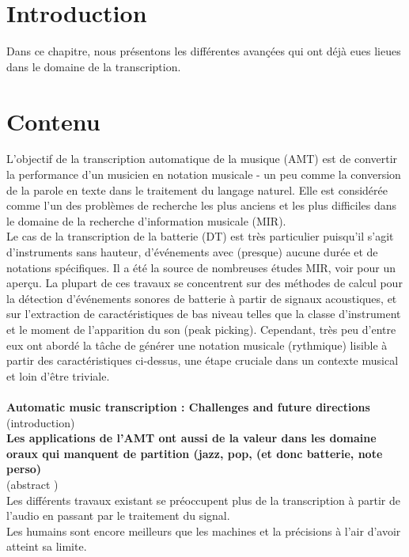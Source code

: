 \section{Introduction}

Dans ce chapitre, nous présentons les différentes avançées qui ont déjà eues lieues dans le domaine de la transcription.

\section{Contenu}
L'objectif de la transcription automatique de la musique (AMT) \cite{article1} est de convertir la performance d'un musicien en notation musicale - un peu comme la conversion de la parole en texte dans le traitement du langage naturel. Elle est considérée comme l'un des problèmes de recherche les plus anciens et les plus difficiles dans le domaine de la recherche d'information musicale (MIR).\\
Le cas de la transcription de la batterie (DT) est très particulier puisqu'il s'agit d'instruments sans hauteur, d'événements avec (presque) aucune durée et de notations spécifiques. Il a été la source de nombreuses études MIR, voir \cite{8350302} pour un aperçu. La plupart de ces travaux se concentrent sur des méthodes de calcul pour la détection d'événements sonores de batterie à partir de signaux acoustiques, et sur l'extraction de caractéristiques de bas niveau telles que la classe d'instrument et le moment de l'apparition du son (peak picking). Cependant, très peu d'entre eux ont abordé la tâche de générer une notation musicale (rythmique) lisible à partir des caractéristiques ci-dessus, une étape cruciale dans un contexte musical et loin d'être triviale.\\\\
\textbf{Automatic music transcription : Challenges and future directions} \cite{article1}\\
(introduction\cite{article1})\\
\textbf{Les applications de l’AMT ont aussi de la valeur dans les domaine oraux qui manquent de partition (jazz, pop, (et donc batterie, note perso)}\\
(abstract \cite{article1})\\
Les différents travaux existant se préoccupent plus de la transcription à partir de l’audio en passant par le traitement du signal.\\
Les humains sont encore meilleurs que les machines et la précisions à l’air d’avoir atteint sa limite.\\
